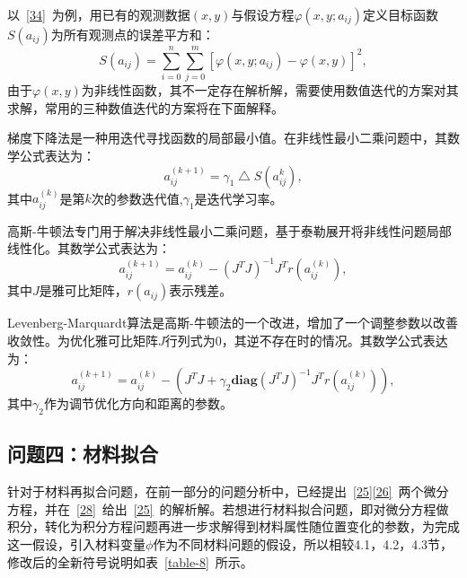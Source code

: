 \documentclass[withoutpreface,bwprint]{cumcmthesis} %
\begin{document}
以~\eqref{34}~为例，用已有的观测数据$\left(
x,y\right)$与假设方程$\varphi\left(x,y;a_{ij}\right)$定义目标函数$S\left(a_{ij}\right)$为所有观测点的误差平方和：
\begin{equation}
    S\left(a_{ij}\right)=\sum_{i=0}^n\sum_{j=0}^m\left[\varphi\left(x,y;a_{ij}\right)-\varphi\left(x,y\right)\right]^2,\label{36}
\end{equation}
由于$\varphi\left(x,y\right)$为非线性函数，其不一定存在解析解，需要使用数值迭代的方案对其求解，常用的三种数值迭代的方案将在下面解释。

梯度下降法是一种用迭代寻找函数的局部最小值。在非线性最小二乘问题中，其数学公式表达为：
\begin{equation}
    a_{ij}^{(k+1)}=\gamma_1 \bigtriangleup S\left(a_{ij}^k\right),\label{37}
\end{equation}
其中$a_{ij}^{(k)}$是第$k$次的参数迭代值,$\gamma_1$是迭代学习率。

高斯-牛顿法专门用于解决非线性最小二乘问题，基于泰勒展开将非线性问题局部线性化。其数学公式表达为：
\begin{equation}
    a_{ij}^{(k+1)}=a_{ij}^{(k)}-\left(J^TJ\right)^{-1}J^Tr\left(a_{ij}^{(k)}\right),\label{38}
\end{equation}
其中$J$是雅可比矩阵，$r\left(a_{ij}\right)$表示残差。

Levenberg-Marquardt算法是高斯-牛顿法的一个改进，增加了一个调整参数以改善收敛性。为优化雅可比矩阵$J$行列式为0，其逆不存在时的情况。其数学公式表达为：
\begin{equation}
    a_{ij}^{(k+1)}=a_{ij}^{(k)}-\left(J^TJ+\gamma_2 \textbf{diag}\left(J^TJ\right)^{-1}J^Tr\left(a_{ij}^{(k)}\right)\right), \label{39}
\end{equation}
其中$\gamma_2$作为调节优化方向和距离的参数。
\subsection{问题四：材料拟合}
针对于材料再拟合问题，在前一部分的问题分析中，已经提出~\eqref{25}\eqref{26}~两个微分方程，并在~\eqref{28}~给出~\eqref{25}~的解析解。若想进行材料拟合问题，即对微分方程做积分，转化为积分方程问题再进一步求解得到材料属性随位置变化的参数，为完成这一假设，引入材料变量$\phi$作为不同材料问题的假设，所以相较4.1，4.2，4.3节，修改后的全新符号说明如表~\ref{table-8}~所示。
\end{document}
